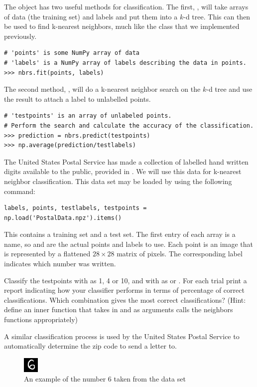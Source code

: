 The  object has two useful methods for classification.
The first, , will take arrays of data (the training set) and labels and put them into a $k$-d tree.
This can then be used to find k-nearest neighbors, much like the  class that we implemented previously.

\begin{lstlisting}
# 'points' is some NumPy array of data
# 'labels' is a NumPy array of labels describing the data in points.
>>> nbrs.fit(points, labels)
\end{lstlisting}

The second method, , will do a k-nearest neighbor search on the $k$-d tree and use the result to attach a label to unlabelled points.

\begin{lstlisting}
# 'testpoints' is an array of unlabeled points.
# Perform the search and calculate the accuracy of the classification.
>>> prediction = nbrs.predict(testpoints)
>>> np.average(prediction/testlabels)
\end{lstlisting}

\begin{problem} %
The United States Postal Service has made a collection of labelled hand written digits available to the public, provided in .
We will use this data for k-nearest neighbor classification.
This data set may be loaded by using the following command:
\begin{lstlisting}
labels, points, testlabels, testpoints = np.load('PostalData.npz').items()
\end{lstlisting}
This contains a training set and a test set.
The first entry of each array is a name, so  and  are the actual points and labels to use.
Each point is an image that is represented by a flattened $28 \times 28$ matrix of pixels.
The corresponding label indicates which number was written.

Classify the testpoints with  as 1, 4 or 10, and with  as  or .
For each trial print a report indicating how your classifier performs in terms of percentage of correct classifications.
Which combination gives the most correct classifications?
(Hint: define an inner function that takes in  and  as arguments calls the neighbors functions appropriately)

A similar classification process is used by the United States Postal Service to automatically determine the zip code to send a letter to.

\begin{figure}[H]
\includegraphics[width=.25\textwidth]{Example.png}
\caption{An example of the number 6 taken from the data set}
\end{figure}
\end{problem}

